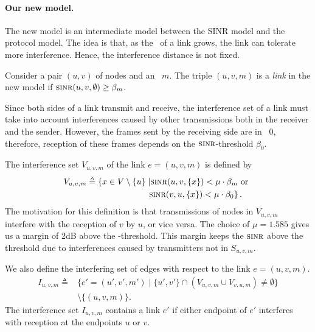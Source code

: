 \documentclass[12pt]{article}
\newtheorem{claim}[theorem]{Claim}
\newenvironment{proof sketch}[1]{\noindent {\emph{Proof sketch of #1:}}}{\hfill \qed}
\newcommand{\eqdf}{\triangleq}
\newcommand{\SINR}{\text{\sc{sinr}}}
\newcommand{\SNR}{\text{\sc{snr}}}
\newcommand{\MCS}{\text{\sc{mcs}}}
\begin{document}
\paragraph{Our new model.}
The new model is an intermediate model between the SINR model and the
protocol model. The idea is that, as the \SNR\ of a link grows, the
link can tolerate more interference. Hence, the interference distance
is not fixed.

Consider a pair $(u,v)$ of nodes and an \MCS\ $m$.
The triple $(u,v,m)$ is a \emph{link} in the new model if
$\SINR(u,v,\emptyset) \geq \beta_m$.

Since both sides of a link transmit and receive, the interference set
of a link must take into account interferences caused by other
transmissions both in the receiver and the sender. However, the frames
sent by the receiving side are in \MCS\ $0$, therefore, reception of
these frames depends on the $\SINR$-threshold $\beta_0$.

The interference set $V_{u,v,m}$ of the link $e=(u,v,m)$ is defined by
  \begin{align*}
    V_{u,v,m} \eqdf \left\{ x \in V \setminus\{u\}\right. &\left | \SINR(u,v,\{x\}) < \mu  \cdot \beta_m \text{ or } \right. \\
    & \left.\SINR(v,u,\{x\}) < \mu \cdot \beta_0\right\}.
\end{align*}
The motivation for this definition is that transmissions of nodes in $V_{u,v,m}$ interfere with
the reception of $v$ by $u$, or vice versa.
The choice of $\mu=1.585$ gives us a margin of $2$dB above the
\SINR-threshold.  This margin keeps the $\SINR$ above the threshold
due to interferences caused by transmitters not in $S_{u,v,m}$.

We also define the interfering set of edges with respect to the link $e=(u,v,m)$.
\begin{align*}
  I_{u,v,m} \eqdf &\{ e'=(u',v',m') \mid \{u',v'\} \cap (V_{u,v,m} \cup V_{v,u,m})
 \neq \emptyset\}\\& \setminus \{(u,v,m)\}.
\end{align*}
The interference set $I_{u,v,m}$ contains a link $e'$ if either
endpoint of $e'$ interferes with reception at the endpoints $u$ or
$v$.

\end{document}
